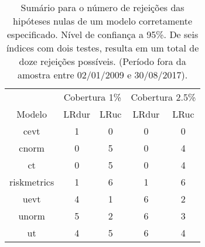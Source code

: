 \begin{table}[H]

\caption{\label{tab:vartest_suma}Sumário para o número de rejeições das hipóteses nulas de um modelo 
corretamente especificado. Nível de confiança a 95\%. De seis índices com 
dois testes, resulta em um total de doze rejeições possíveis. 
(Período fora da amostra entre 02/01/2009 e 30/08/2017).}
\centering
\begin{tabular}[t]{ccccc}
\toprule
\multicolumn{1}{c}{} & \multicolumn{2}{c}{Cobertura 1\%} & \multicolumn{2}{c}{Cobertura 2.5\%} \\
\cmidrule(l{2pt}r{2pt}){2-3} \cmidrule(l{2pt}r{2pt}){4-5}
Modelo & LRdur & LRuc & LRdur & LRuc\\
\midrule
cevt & 1 & 0 & 0 & 0\\
cnorm & 0 & 5 & 0 & 4\\
ct & 0 & 5 & 0 & 4\\
riskmetrics & 1 & 6 & 1 & 6\\
uevt & 4 & 1 & 6 & 2\\
\addlinespace
unorm & 5 & 2 & 6 & 3\\
ut & 4 & 5 & 6 & 4\\
\bottomrule
\end{tabular}
\end{table}
